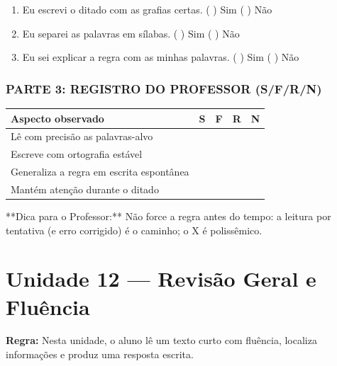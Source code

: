 \begin{exercicio}
\begin{enumerate}[label=\alph*)]
  \item Eu escrevi o ditado com as grafias certas.  \quad ( ) Sim   ( ) Não

  \item Eu separei as palavras em sílabas.  \quad ( ) Sim   ( ) Não

  \item Eu sei explicar a regra com as minhas palavras.  \quad ( ) Sim   ( ) Não

\end{enumerate}

\subsection*{PARTE 3: REGISTRO DO PROFESSOR (S/F/R/N)}

\begin{center}
\renewcommand{\arraystretch}{1.4}
\begin{tabular}{@{}p{9cm}cccc@{}}
\toprule
Aspecto observado & S & F & R & N \\
\midrule
Lê com precisão as palavras-alvo & & & & \\
Escreve com ortografia estável & & & & \\
Generaliza a regra em escrita espontânea & & & & \\
Mantém atenção durante o ditado & & & & \\
\bottomrule\end{tabular}\end{center}

\end{exercicio}

\begin{dica}
**Dica para o Professor:** Não force a regra antes do tempo: a leitura por tentativa (e erro corrigido) é o caminho; o X é polissêmico.
\end{dica}


\chapter{Unidade 12 --- Revisão Geral e Fluência}


\textbf{Regra:} Nesta unidade, o aluno lê um texto curto com fluência, localiza informações e produz uma resposta escrita.

